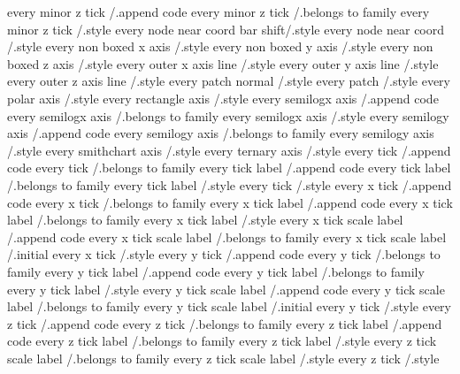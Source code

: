 every minor z tick             /.append code
every minor z tick             /.belongs to family
every minor z tick             /.style
every node near coord bar shift/.style
every node near coord          /.style
every non boxed x axis         /.style
every non boxed y axis         /.style
every non boxed z axis         /.style
every outer x axis line        /.style
every outer y axis line        /.style
every outer z axis line        /.style
every patch normal             /.style
every patch                    /.style
every polar axis               /.style
every rectangle axis           /.style
every semilogx axis            /.append code
every semilogx axis            /.belongs to family
every semilogx axis            /.style
every semilogy axis            /.append code
every semilogy axis            /.belongs to family
every semilogy axis            /.style
every smithchart axis          /.style
every ternary axis             /.style
every tick                     /.append code
every tick                     /.belongs to family
every tick label               /.append code
every tick label               /.belongs to family
every tick label               /.style
every tick                     /.style
every x tick                   /.append code
every x tick                   /.belongs to family
every x tick label             /.append code
every x tick label             /.belongs to family
every x tick label             /.style
every x tick scale label       /.append code
every x tick scale label       /.belongs to family
every x tick scale label       /.initial
every x tick                   /.style
every y tick                   /.append code
every y tick                   /.belongs to family
every y tick label             /.append code
every y tick label             /.belongs to family
every y tick label             /.style
every y tick scale label       /.append code
every y tick scale label       /.belongs to family
every y tick scale label       /.initial
every y tick                   /.style
every z tick                   /.append code
every z tick                   /.belongs to family
every z tick label             /.append code
every z tick label             /.belongs to family
every z tick label             /.style
every z tick scale label       /.belongs to family
every z tick scale label       /.style
every z tick                   /.style

